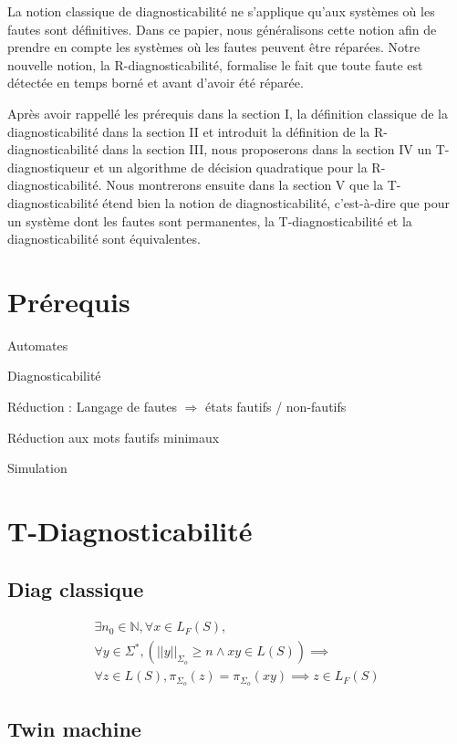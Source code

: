 \documentclass[conference]{IEEEtran}
\begin{document}
La notion classique de diagnosticabilit\'e\cite{SamSRST96} ne s'applique qu'aux systèmes où les fautes sont définitives. Dans ce papier, nous généralisons cette notion afin de prendre en compte les systèmes où les fautes peuvent être r\'eparées. Notre nouvelle notion, la R-diagnosticabilit\'e, formalise le fait que toute faute est détectée en temps born\'e et avant d'avoir été r\'epar\'ee.

Après avoir rappellé les prérequis dans la section I, la définition classique de la diagnosticabilité dans la section II et introduit la définition de la R-diagnosticabilit\'e dans la section III, nous proposerons dans la section IV un T-diagnostiqueur et un algorithme de d\'ecision quadratique pour la R-diagnosticabilit\'e. Nous montrerons ensuite dans la section V que la T-diagnosticabilit\'e \'etend bien la notion de diagnosticabilit\'e, c'est-\`a-dire que pour un syst\`eme dont les fautes sont permanentes, la T-diagnosticabilit\'e et la diagnosticabilit\'e sont \'equivalentes.

\section{Pr\'erequis}

Automates

Diagnosticabilit\'e

R\'eduction : Langage de fautes $\Rightarrow$ \'etats fautifs / non-fautifs

R\'eduction aux mots fautifs minimaux

Simulation

\section{T-Diagnosticabilit\'e}

\subsection{Diag classique}
$$\begin{array}{l}
\exists n_0 \in \mathbb N, \forall x \in L_F(S),\\
\forall y \in \Sigma^*, \left(||y||_{\Sigma_o} \ge n \land xy \in  L(S)\right) \implies\\
\forall z \in L(S), \pi_{\Sigma_o}(z)=\pi_{\Sigma_o}(xy) \implies z \in L_F(S)
\end{array}$$

\subsection{Twin machine}
\end{document}
